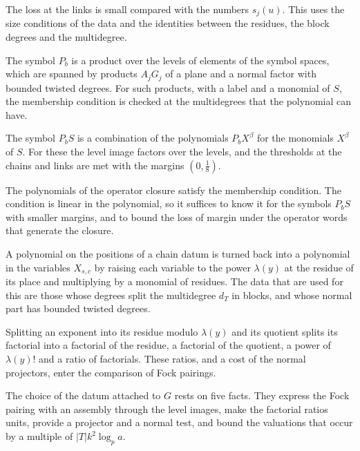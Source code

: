 The loss at the links is small compared with the numbers $s_j(u)$. This uses the size conditions of the data and the
identities between the residues, the block degrees and the multidegree.

The symbol $P_b$ is a product over the levels of elements of the symbol spaces, which are spanned by products $A_jG_j$
of a plane and a normal factor with bounded twisted degrees. For such products, with a label and a monomial of $S$, the
membership condition is checked at the multidegrees that the polynomial can have.

The symbol $P_bS$ is a combination of the polynomials $P_bX^\beta$ for the monomials $X^\beta$ of $S$. For these the
level image factors over the levels, and the thresholds at the chains and links are met with the margins
$(0,\frac18)$.

The polynomials of the operator closure satisfy the membership condition. The condition is linear in the polynomial,
so it suffices to know it for the symbols $P_bS$ with smaller margins, and to bound the loss of margin under the
operator words that generate the closure.

A polynomial on the positions of a chain datum is turned back into a polynomial in the variables $X_{s,c}$ by raising
each variable to the power $\lambda(y)$ at the residue of its place and multiplying by a monomial of residues. The data
that are used for this are those whose degrees split the multidegree $d_T$ in blocks, and whose normal part has bounded
twisted degrees.

Splitting an exponent into its residue modulo $\lambda(y)$ and its quotient splits its factorial into a factorial of the
residue, a factorial of the quotient, a power of $\lambda(y)!$ and a ratio of factorials. These ratios, and a cost of the
normal projectors, enter the comparison of Fock pairings.

The choice of the datum attached to $G$ rests on five facts. They express the Fock pairing with an assembly through the
level images, make the factorial ratios units, provide a projector and a normal test, and bound the valuations that
occur by a multiple of $|T|k^2\log_pa$.

